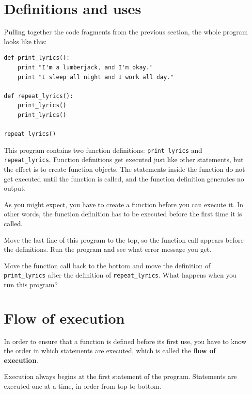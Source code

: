 \documentclass[10pt]{book}
\begin{document}
\section{Definitions and uses}

Pulling together the code fragments from the previous section, the
whole program looks like this:

\beforeverb
\begin{verbatim}
def print_lyrics():
    print "I'm a lumberjack, and I'm okay."
    print "I sleep all night and I work all day."

def repeat_lyrics():
    print_lyrics()
    print_lyrics()

repeat_lyrics()
\end{verbatim}
\afterverb
%
This program contains two function definitions: \verb"print_lyrics" and
\verb"repeat_lyrics".  Function definitions get executed just like other
statements, but the effect is to create function objects.  The statements
inside the function do not get executed until the function is called, and
the function definition generates no output.


As you might expect, you have to create a function before you can
execute it.  In other words, the function definition has to be
executed before the first time it is called.

\begin{ex}
Move the last line of this program
to the top, so the function call appears before the definitions. Run 
the program and see what error
message you get.
\end{ex}

\begin{ex}
Move the function call back to the bottom
and move the definition of \verb"print_lyrics" after the definition of
\verb"repeat_lyrics".  What happens when you run this program?
\end{ex}


\section{Flow of execution}

In order to ensure that a function is defined before its first use,
you have to know the order in which statements are executed, which is
called the {\bf flow of execution}.

Execution always begins at the first statement of the program.
Statements are executed one at a time, in order from top to bottom.
\end{document}
